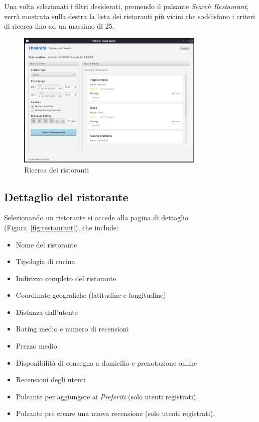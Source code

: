 Una volta selezionati i filtri desiderati, 
premendo il pulsante \emph{Search Restaurant}, verrà
mostrata sulla destra la lista dei ristoranti più vicini 
che soddisfano i criteri di ricerca fino ad un massimo di 25.
\begin{figure}[H]
    \centering
    \includegraphics[width=0.8\textwidth]{images/search2.png}
    \caption{Ricerca dei ristoranti}
    \label{fig:search2}
\end{figure}

\subsection{Dettaglio del ristorante}
Selezionando un ristorante si accede alla pagina di dettaglio (Figura~\ref{fig:restaurant}), che include:
\begin{itemize}
    \item Nome del ristorante
    \item Tipologia di cucina
    \item Indirizzo completo del ristorante
    \item Coordinate geografiche (latitudine e longitudine)
    \item Distanza dall'utente
    \item Rating medio e numero di recensioni
    \item Prezzo medio
    \item Disponibilità di consegna a domicilio e prenotazione online
    \item Recensioni degli utenti
    \item Pulsante per aggiungere ai \emph{Preferiti} (solo utenti registrati).
    \item Pulsante pre creare una nuova recensione (solo utenti registrati).
\end{itemize}

